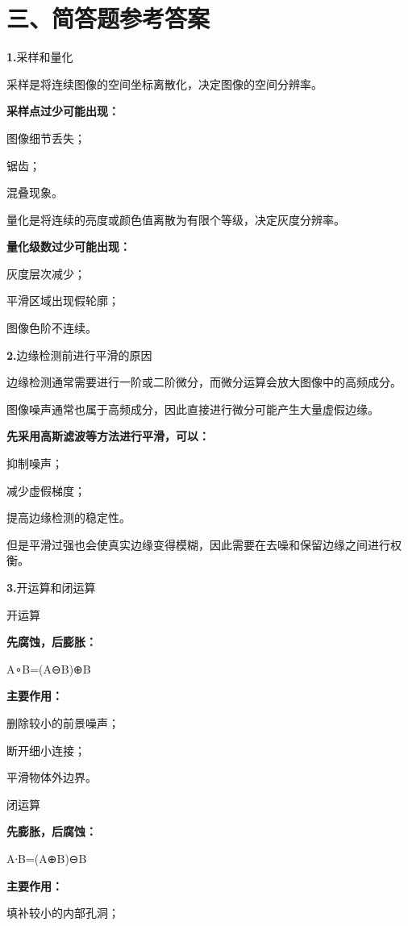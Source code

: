 \documentclass[UTF8,openany,oneside,zihao=-4,fontset=windows]{ctexbook}
\newcommand{\Question}[2]{%
  \par\Needspace{4\baselineskip}\medskip
  \noindent\textbf{\color{MVBlue}#1}\quad #2\par
}
\begin{document}
\section{三、简答题参考答案}
\Question{1.}{采样和量化}
\par 采样是将连续图像的空间坐标离散化，决定图像的空间分辨率。
\par\noindent\textbf{采样点过少可能出现：}
\par\noindent\textbullet\quad 图像细节丢失；
\par\noindent\textbullet\quad 锯齿；
\par 混叠现象。
\par 量化是将连续的亮度或颜色值离散为有限个等级，决定灰度分辨率。
\par\noindent\textbf{量化级数过少可能出现：}
\par\noindent\textbullet\quad 灰度层次减少；
\par\noindent\textbullet\quad 平滑区域出现假轮廓；
\par 图像色阶不连续。
\Question{2.}{边缘检测前进行平滑的原因}
\par 边缘检测通常需要进行一阶或二阶微分，而微分运算会放大图像中的高频成分。
\par 图像噪声通常也属于高频成分，因此直接进行微分可能产生大量虚假边缘。
\par\noindent\textbf{先采用高斯滤波等方法进行平滑，可以：}
\par\noindent\textbullet\quad 抑制噪声；
\par\noindent\textbullet\quad 减少虚假梯度；
\par 提高边缘检测的稳定性。
\par 但是平滑过强也会使真实边缘变得模糊，因此需要在去噪和保留边缘之间进行权衡。
\Question{3.}{开运算和闭运算}
\par 开运算
\par\noindent\textbf{先腐蚀，后膨胀：}
\par A∘B=(A⊖B)⊕B
\par\noindent\textbf{主要作用：}
\par\noindent\textbullet\quad 删除较小的前景噪声；
\par\noindent\textbullet\quad 断开细小连接；
\par 平滑物体外边界。
\par 闭运算
\par\noindent\textbf{先膨胀，后腐蚀：}
\par A∙B=(A⊕B)⊖B
\par\noindent\textbf{主要作用：}
\par\noindent\textbullet\quad 填补较小的内部孔洞；
\end{document}
